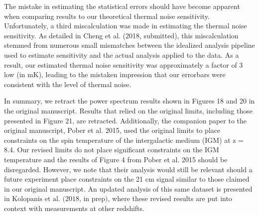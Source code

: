 \documentclass[onecolumn]{emulateapj} \shorttitle{}
\newcommand{\hMpci}{h\ {\rm Mpc}^{-1}}
\newcommand{\kolopaniscitet}{\textrm{Kolopanis et al. (2018, in prep)}}
\newcommand{\chengcitet}{\textrm{Cheng et al. (2018, submitted)}}
\begin{document}
The mistake in estimating the statistical errors should have become apparent when comparing results to our theoretical
thermal noise sensitivity.  Unfortunately, a third miscalculation was made in estimating the thermal noise sensitivity.
As detailed in \chengcitet, this miscalculation stemmed from numerous small mismatches between the idealized analysis
pipeline used to estimate sensitivity and the actual analysis applied to the data.  As a result, our estimated thermal
noise sensitivity was approximately a factor of 3 low (in $\textrm{mK}$), leading to the mistaken impression that our
errorbars were consistent with the level of thermal noise.

In summary, we retract the power spectrum results shown in Figures 18 and 20 in the original manuscript.
Results that relied on the original limits, including those presented in Figure 21,
are retracted.  Additionally, the companion paper to the original manuscript,
Pober et al. 2015, used the original limits to place constraints on the spin
temperature of the intergalactic medium (IGM) at z = 8.4.  Our revised limits
do not place significant constraints on the IGM temperature and the results of
Figure 4 from Pober et al. 2015 should be disregarded.  However, we note that
their analysis would still be relevant should a future experiment place
constraints on the 21 cm signal similar to those claimed in our original
manuscript.
An updated analysis of this same dataset is presented in $\kolopaniscitet$, where these revised results are put into context with measurements at other 
redshifts.


\nocite{*}


\end{document}
